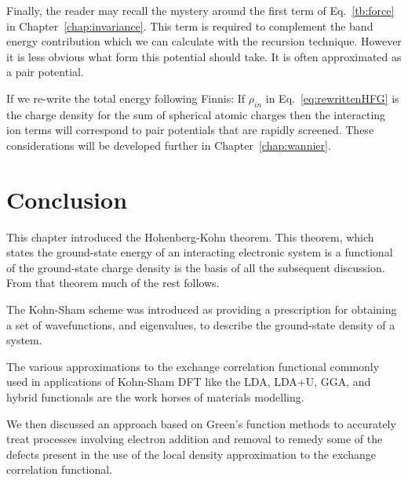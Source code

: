 Finally, the reader may recall the mystery around the first term 
of Eq.~\ref{tb:force} in Chapter~\ref{chap:invariance}. This term is required to complement
the band energy contribution which we can calculate with the recursion technique. However it is
less obvious what form this potential should take. It is often approximated as a pair potential.

If we re-write the total energy following Finnis:
%
%
If $\rho_{in}$ in Eq.~\ref{eq:rewrittenHFG} is the charge density for the sum of spherical atomic 
charges then the interacting ion terms will correspond to pair potentials that are rapidly screened. 
These considerations will be developed further in Chapter~\ref{chap:wannier}.

\section{Conclusion}
\noindent
This chapter introduced the Hohenberg-Kohn theorem. This theorem,
which states the ground-state energy of an interacting electronic system 
is a functional of the ground-state charge density is the basis of all the
subsequent discussion. From that theorem much of the rest follows.

The Kohn-Sham scheme was introduced as providing 
a prescription for obtaining a set of wavefunctions, 
and eigenvalues, to describe the ground-state density of a system. 

The various approximations to the exchange correlation 
functional commonly used in applications of Kohn-Sham DFT like the LDA, LDA+U,
GGA, and hybrid functionals are the work horses of materials modelling. 

We then discussed an approach based on Green's function methods 
to accurately treat processes involving electron addition and removal
to remedy some of the defects present in the use of the local density approximation
to the exchange correlation functional. 

